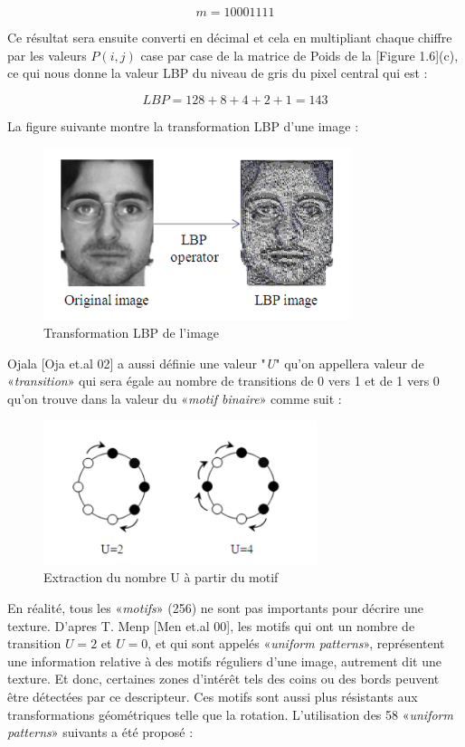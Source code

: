 $$ m = 10001111 $$

Ce résultat sera ensuite converti en décimal et cela en multipliant chaque chiffre par les valeurs $P(i,j)$ case par case de la matrice de Poids de la [Figure 1.6](c), ce qui nous donne la valeur LBP du niveau de gris du pixel central qui est :

$$ LBP = 128+8+4+2+1 = 143 $$

La figure suivante montre la transformation LBP d'une image :

\begin{figure}[H]
	\centering
	\includegraphics[width=9cm,]{Figures/chap1/transLBP.png}		
	\caption[transLBP]{Transformation LBP de l'image}
\end{figure}	


\indent Ojala [Oja et.al 02] a aussi définie une valeur "\textit{U}" qu'on appellera valeur de «\textit{transition}» qui sera égale au nombre de transitions de 0 vers 1 et de 1 vers 0 qu'on trouve dans la valeur du «\textit{motif binaire}» comme suit :\\

\begin{figure}[H]
	\centering
	\includegraphics[width=8cm]{Figures/chap1/extractU.png}		
	\caption[extractU]{ Extraction du nombre U à partir du motif}
\end{figure}	

\indent En réalité, tous les «\textit{motifs}» (256) ne sont pas importants pour décrire une texture.
D'apres T. Menp [Men et.al 00], les motifs qui ont un nombre de transition $U=2$ et $U=0$, et qui sont appelés «\textit{uniform patterns}», représentent une information relative à des motifs réguliers d'une image, autrement dit une texture. Et donc, certaines zones d'intérêt tels des coins ou des bords peuvent être détectées par ce descripteur.
Ces motifs sont aussi plus résistants aux transformations géométriques telle que la rotation.
L’utilisation des 58 «\textit{uniform patterns}» suivants a été proposé :

